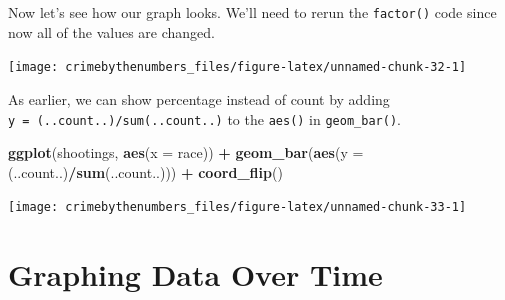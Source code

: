 \documentclass[
  12pt,
]{book}
\newenvironment{Shaded}{\begin{snugshade}}{\end{snugshade}}
\newcommand{\DataTypeTok}[1]{\textcolor[rgb]{0.27,0.27,0.27}{#1}}
\newcommand{\KeywordTok}[1]{\textcolor[rgb]{0.27,0.27,0.27}{\textbf{#1}}}
\newcommand{\NormalTok}[1]{#1}
\newcommand{\OperatorTok}[1]{\textcolor[rgb]{0.43,0.43,0.43}{\textbf{#1}}}
\newcommand{\OtherTok}[1]{\textcolor[rgb]{0.37,0.37,0.37}{#1}}
\newcommand{\StringTok}[1]{\textcolor[rgb]{0.5,0.5,0.5}{#1}}
\begin{document}
Now let's see how our graph looks. We'll need to rerun the \texttt{factor()} code since now all of the values are changed.

\begin{Shaded}
\end{Shaded}

\begin{center}\texttt{[image: crimebythenumbers\_files/figure-latex/unnamed-chunk-32-1]} \end{center}

As earlier, we can show percentage instead of count by adding \texttt{y\ =\ (..count..)/sum(..count..)} to the \texttt{aes()} in \texttt{geom\_bar()}.

\begin{Shaded}
\begin{Highlighting}[]
\KeywordTok{ggplot}\NormalTok{(shootings, }\KeywordTok{aes}\NormalTok{(}\DataTypeTok{x =}\NormalTok{ race)) }\OperatorTok{+}\StringTok{ }
\StringTok{  }\KeywordTok{geom\_bar}\NormalTok{(}\KeywordTok{aes}\NormalTok{(}\DataTypeTok{y =}\NormalTok{ (..count..)}\OperatorTok{/}\KeywordTok{sum}\NormalTok{(..count..))) }\OperatorTok{+}
\StringTok{  }\KeywordTok{coord\_flip}\NormalTok{() }
\end{Highlighting}
\end{Shaded}

\begin{center}\texttt{[image: crimebythenumbers\_files/figure-latex/unnamed-chunk-33-1]} \end{center}

\hypertarget{graphing-data-over-time}{%
\section{Graphing Data Over Time}\label{graphing-data-over-time}}
\end{document}
